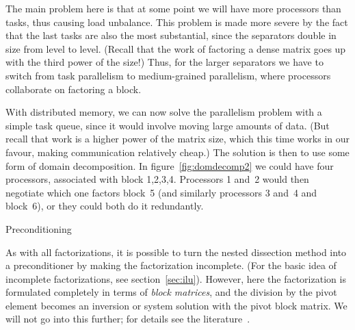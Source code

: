 The main problem here is that at some point we will have more
processors than tasks, thus causing load unbalance. This problem is
made more severe by the fact that the last tasks are also the most
substantial, since the separators double in size from level to
level. (Recall that the work of factoring a dense matrix goes up with the
third power of the size!) Thus, for the larger separators we have to
switch from task parallelism to medium-grained parallelism, where
processors collaborate on factoring a block.

With distributed memory, we can now solve the parallelism problem with
a simple task queue, since it would involve moving large amounts of
data. (But recall that work is a higher power of the matrix size,
which this time works in our favour, making communication relatively
cheap.) The solution is then to use some form of domain
decomposition. In figure~\ref{fig:domdecomp2} we could have four
processors, associated with block 1,2,3,4. Processors 1 and~2 would
then negotiate which one factors block~5 (and similarly processors 3
and~4 and block~6), or they could both do it redundantly.

 {Preconditioning}

As with all factorizations, it is possible to turn the nested
dissection method into a preconditioner by making the factorization
incomplete. (For the basic idea of incomplete factorizations, see
section~\ref{sec:ilu}). However, here the factorization is formulated
completely in terms of \emph{block matrices}, and
the division by the pivot element becomes an inversion or system
solution with the pivot block matrix. We will not go into this
further; for details see the
literature~\cite{AxPo:dd2,Eij:general,Me:dd}.
